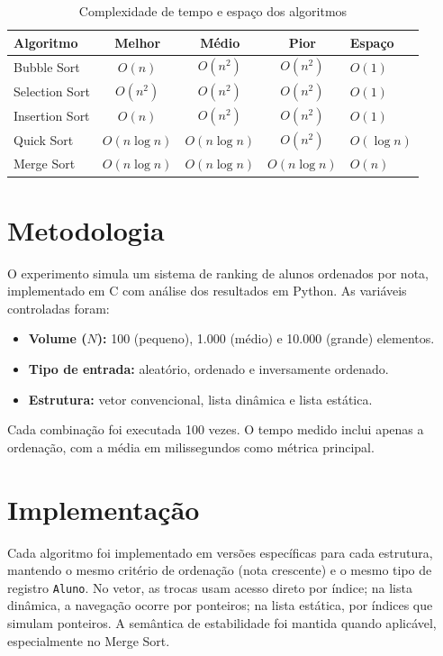 \documentclass[conference]{IEEEtran}
\begin{document}
\begin{table}[htbp]
\centering
\caption{Complexidade de tempo e espaço dos algoritmos}
\label{tab:complexidade}
\renewcommand{\arraystretch}{1.3}
\begin{tabular}{lcccl}
\toprule
\textbf{Algoritmo} & \textbf{Melhor} & \textbf{Médio} & \textbf{Pior} & \textbf{Espaço} \\
\midrule
Bubble Sort    & $O(n)$        & $O(n^2)$      & $O(n^2)$      & $O(1)$ \\
Selection Sort & $O(n^2)$      & $O(n^2)$      & $O(n^2)$      & $O(1)$ \\
Insertion Sort & $O(n)$        & $O(n^2)$      & $O(n^2)$      & $O(1)$ \\
Quick Sort     & $O(n \log n)$ & $O(n \log n)$ & $O(n^2)$      & $O(\log n)$ \\
Merge Sort     & $O(n \log n)$ & $O(n \log n)$ & $O(n \log n)$ & $O(n)$ \\
\bottomrule
\end{tabular}
\end{table}

\section{Metodologia}

O experimento simula um sistema de ranking de alunos ordenados por nota, implementado em C com análise dos resultados em Python. As variáveis controladas foram:

\begin{itemize}
    \item \textbf{Volume ($N$):} 100 (pequeno), 1.000 (médio) e 10.000 (grande) elementos.
    \item \textbf{Tipo de entrada:} aleatório, ordenado e inversamente ordenado.
    \item \textbf{Estrutura:} vetor convencional, lista dinâmica e lista estática.
\end{itemize}

Cada combinação foi executada 100 vezes. O tempo medido inclui apenas a ordenação, com a média em milissegundos como métrica principal.

\section{Implementação}

Cada algoritmo foi implementado em versões específicas para cada estrutura, mantendo o mesmo critério de ordenação (nota crescente) e o mesmo tipo de registro \texttt{Aluno}. No vetor, as trocas usam acesso direto por índice; na lista dinâmica, a navegação ocorre por ponteiros; na lista estática, por índices que simulam ponteiros. A semântica de estabilidade foi mantida quando aplicável, especialmente no Merge Sort.
\end{document}
